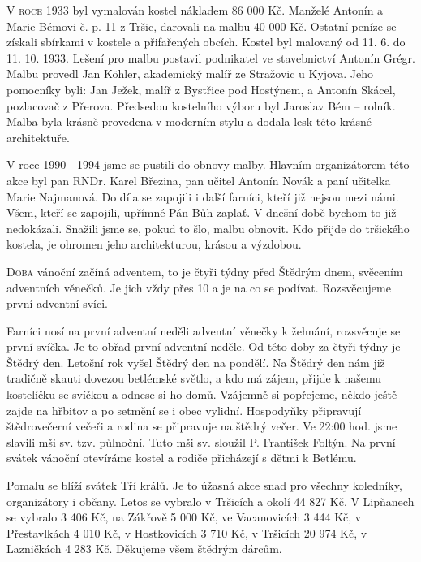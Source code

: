 \documentclass[11pt]{article}
\begin{document}
\begin{multicols}{3}{

\lettrine{V}{ roce} 1933 byl vymalován kostel nákladem 86 000 Kč. Manželé Antonín a Marie Bémovi č. p. 11 z Tršic, darovali na malbu 40 000 Kč. Ostatní peníze se získali sbírkami v kostele a přifařených obcích. Kostel byl malovaný od 11. 6. do 11. 10. 1933. Lešení pro malbu postavil podnikatel ve stavebnictví Antonín Grégr. Malbu provedl Jan Köhler, akademický malíř ze Stražovic u Kyjova. Jeho pomocníky byli: Jan Ježek, malíř z Bystřice pod Hostýnem, a Antonín Skácel, pozlacovač z Přerova. Předsedou kostelního výboru byl Jaroslav Bém – rolník. Malba byla krásně provedena v moderním stylu a dodala lesk této krásné architektuře.

V roce 1990 - 1994 jsme se pustili do obnovy malby. Hlavním organizátorem této akce byl pan RNDr. Karel Březina, pan učitel Antonín Novák a paní učitelka Marie Najmanová. Do díla se zapojili i další farníci, kteří již nejsou mezi námi. 
Všem, kteří se zapojili, upřímné Pán Bůh zaplať. V dnešní době bychom to již nedokázali.
Snažili jsme se, pokud to šlo, malbu obnovit. Kdo přijde do tršického kostela, je ohromen jeho architekturou, krásou a výzdobou.
\closearticle


\lettrine{D}{oba} vánoční začíná adventem, to je čtyři týdny před Štědrým dnem, svěcením adventních věnečků. Je jich vždy přes 10 a je na co se podívat.  Rozsvěcujeme první adventní svíci.

Farníci nosí na první adventní neděli adventní věnečky k žehnání, rozsvěcuje se první svíčka. Je to obřad první adventní neděle. Od této doby za čtyři týdny je Štědrý den. Letošní rok vyšel Štědrý den na pondělí. Na Štědrý den nám již tradičně skauti dovezou betlémské světlo, a kdo má zájem, přijde k našemu kostelíčku se svíčkou a odnese si ho domů. Vzájemně si popřejeme, někdo ještě zajde na hřbitov a po setmění se i obec vylidní. Hospodyňky připravují štědrovečerní večeři a rodina se připravuje na štědrý večer. Ve 22:00 hod. jsme slavili mši sv. tzv. půlnoční. Tuto mši sv. sloužil P. František Foltýn. Na první svátek vánoční otevíráme kostel a rodiče přicházejí s dětmi k Betlému.

Pomalu se blíží svátek Tří králů. Je to úžasná akce snad pro všechny koledníky, organizátory i občany. Letos se vybralo v Tršicích a okolí 44 827 Kč. V Lipňanech se vybralo 3 406 Kč, na Zákřově 5 000 Kč, ve Vacanovicích 3 444 Kč, v Přestavlkách 4 010 Kč, v Hostkovicích 3 710 Kč, v Tršicích 20 974 Kč, v Lazničkách 4 283 Kč. Děkujeme všem štědrým dárcům.
}\end{multicols}

\thispagestyle{myinfo}
\end{document}
